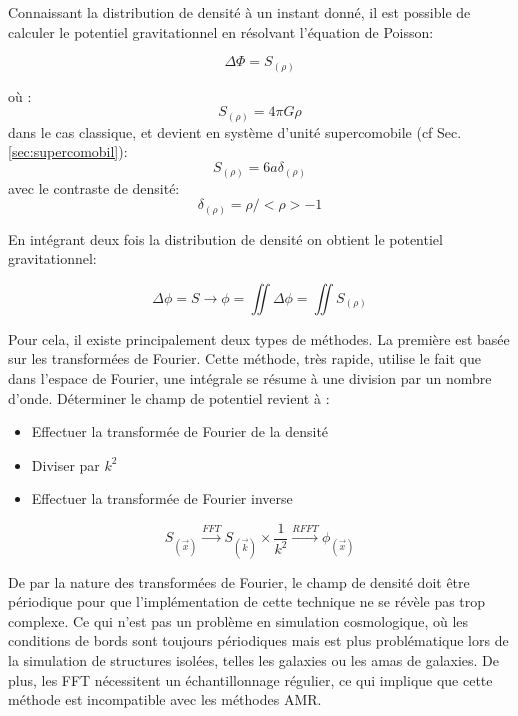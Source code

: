 Connaissant la distribution de densité à un instant donné, il est possible de calculer le potentiel gravitationnel en résolvant l'équation de Poisson:

\begin{equation}
\Delta \Phi = S_{(\rho)}
\end{equation}

où :
\begin{equation}
S_{(\rho)} = 4 \pi G \rho
\end{equation}
dans le cas classique, et devient en système d'unité supercomobile (cf Sec. \ref{sec:supercomobil}):
\begin{equation}
S_{(\rho)} = 6 a \delta_{(\rho)}
\end{equation}
avec le contraste de densité: 
\begin{equation}
\delta_{(\rho)} = \rho / < \rho > - 1 
\end{equation}

En intégrant deux fois la distribution de densité on obtient le potentiel gravitationnel:

\begin{equation}
\Delta \phi = S \longrightarrow \phi = \iint \Delta \phi = \iint S_{(\rho)}
\end{equation}

Pour cela, il existe principalement deux types de méthodes. 
La première est basée sur les transformées de Fourier. 
Cette méthode, très rapide, utilise le fait que dans l'espace de Fourier, une intégrale se résume à une division par un nombre d'onde. 
Déterminer le champ de potentiel revient à : 
\begin{itemize}
\item Effectuer la transformée de Fourier de la densité
\item Diviser par $k^2$
\item Effectuer la transformée de Fourier inverse
\end{itemize}

\begin{equation}
S_{(\vec{x})} \overset{FFT}{\longrightarrow}  S_{(\vec{k})} \times \frac{1}{k^2}  \overset{RFFT}{\longrightarrow}  \phi_{(\vec{x})}
\end{equation}

De par la nature des transformées de Fourier, le champ de densité doit être périodique pour que l'implémentation de cette technique ne se révèle pas trop complexe. 
Ce qui n'est pas un problème en simulation cosmologique, où les conditions de bords sont toujours périodiques mais est plus problématique lors de la simulation de structures isolées, telles les galaxies ou les amas de galaxies. 
De plus, les FFT nécessitent un échantillonnage régulier, ce qui implique que cette méthode est incompatible avec les méthodes \ac{AMR}. 

